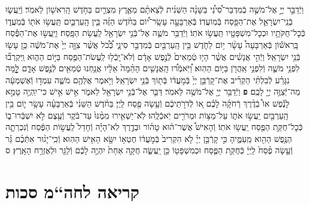 \documentclass[twoside, openany, parskip=half, 11pt]{book}
\begin{document}
\begin{footnotesize}
\begin{multicols}{2}
\\
\\
וַיְֿדַבֵּ֣ר יְיָ֣ אֶל־מֹשֶׁ֣ה בְֿמִדְבַּר־סִ֠ינַ֠י בַּשָּׁנָ֨ה הַשֵּׁנִ֜ית לְֿצֵאתָ֨ם מֵאֶ֧רֶץ מִצְרַ֛יִם בַּחֹ֥דֶשׁ הָֽרִאשׁ֖וֹן לֵאמֹֽר׃ וְֿיַֽעֲשׂ֧וּ בְֿנֵֽי־יִשְׂרָאֵ֛ל אֶת־הַפָּ֖סַח בְּֿמֽוֹעֲדֽוֹ׃ בְּֿאַרְבָּעָ֣ה עָשָֽׂר־י֠וֹם בַּחֹ֨דֶשׁ הַזֶּ֜ה בֵּ֧ין הָֽעַרְבַּ֛יִם תַּֽעֲשׂ֥וּ אֹת֖וֹ בְּֿמֹֽעֲד֑וֹ כְּֿכׇל־חֻקֹּתָ֥יו וּכְכׇל־מִשְׁפָּטָ֖יו תַּֽעֲשׂ֥וּ אֹתֽוֹ׃ וַיְֿדַבֵּ֥ר מֹשֶׁ֛ה אֶל־בְּֿנֵ֥י יִשְׂרָאֵ֖ל לַֽעֲשׂ֥ת הַפָּֽסַח׃ וַיַּֽעֲשׂ֣וּ אֶת־הַפֶּ֡סַח בָּֽרִאשׁ֡וֹן בְּֿאַרְבָּעָה֩ עָשָׂ֨ר י֥וֹם לַחֹ֛דֶשׁ בֵּ֥ין הָֽעַרְבַּ֖יִם בְּֿמִדְבַּ֣ר סִינָ֑י כְּֿ֠כֹ֠ל אֲשֶׁ֨ר צִוָּ֤ה יְיָ֙ אֶת־מֹשֶׁ֔ה כֵּ֥ן עָשׂ֖וּ בְּֿנֵ֥י יִשְׂרָאֵֽל׃
וַיְֿהִ֣י אֲנָשִׁ֗ים אֲשֶׁ֨ר הָי֤וּ טְֿמֵאִים֙ לְֿנֶ֣פֶשׁ אָדָ֔ם וְֿלֹא־יָֽכְֿל֥וּ לַֽעֲשֹׂת־הַפֶּ֖סַח בַּיּ֣וֹם הַה֑וּא וַֽיִּקְרְב֞וּ לִפְנֵ֥י מֹשֶׁ֛ה וְֿלִפְנֵ֥י אַֽהֲרֹ֖ן בַּיּ֥וֹם הַהֽוּא׃ וַ֠יֹּֽאמְֿר֠וּ הָֽאֲנָשִׁ֤ים הָהֵ֨מָּה֙ אֵלָ֔יו אֲנַ֥חְנוּ טְֿמֵאִ֖ים לְֿנֶ֣פֶשׁ אָדָ֑ם לׇׇׇָ֣מָּה נִגָּרַ֗ע לְֿבִלְתִּ֨י הַקְרִ֜יב אֶת־קָרְֿבַּ֤ן יְיָ֙ בְּֿמֹ֣עֲד֔וֹ בְּֿת֖וֹךְ בְּֿנֵ֥י יִשְׂרָאֵֽל׃ וַיֹּ֥אמֶר אֲלֵהֶ֖ם מֹשֶׁ֑ה עִמְד֣וּ וְֿאֶשְׁמְעָ֔ה מַה־יְּֿצַוֶּ֥ה יְיָ֖ לָכֶֽם׃ \textbf{פ}
וַיְֿדַבֵּ֥ר יְיָ֖ אֶל־מֹשֶׁ֥ה לֵּאמֹֽר׃ דַּבֵּ֛ר אֶל־בְּֿנֵ֥י יִשְׂרָאֵ֖ל לֵאמֹ֑ר אִ֣ישׁ אִ֣ישׁ כִּי־יִֽהְיֶ֥ה טָמֵ֣א לָנֶ֡פֶשׁ אוֹ֩ בְֿדֶ֨רֶךְ רְֿחֹקָ֜הֹ לָכֶ֗ם א֚וֹ לְֿדֹרֹ֣תֵיכֶ֔ם וְֿעָ֥שָׂה פֶ֖סַח לַֽיְיָ׃ בַּחֹ֨דֶשׁ הַשֵּׁנִ֜י בְּֿאַרְבָּעָ֨ה עָשָׂ֥ר י֛וֹם בֵּ֥ין הָֽעַרְבַּ֖יִם יַֽעֲשׂ֣וּ אֹת֑וֹ עַל־מַצּ֥וֹת וּמְרֹרִ֖ים יֹֽאכְֿלֻֽהוּ׃ לֹֽא־יַשְׁאִ֤ירוּ מִמֶּ֨נּוּ֙ עַד־בֹּ֔קֶר וְֿעֶ֖צֶם לֹ֣א יִשְׁבְּֿרוּ־ב֑וֹ כְּֿכׇל־חֻקַּ֥ת הַפֶּ֖סַח יַֽעֲשׂ֥וּ אֹתֽוֹ׃ וְֿהָאִישׁ֩ אֲשֶׁר־ה֨וּא טָה֜וֹר וּבְדֶ֣רֶךְ לֹֽא־הָיָ֗ה וְֿחָדַל֙ לַֽעֲשׂ֣וֹת הַפֶּ֔סַח וְֿנִכְרְתָ֛ה הַנֶּ֥פֶשׁ הַהִ֖וא מֵֽעַמֶּ֑יהָ כִּ֣י קָרְֿבַּ֣ן יְיָ֗ לֹ֤א הִקְרִיב֙ בְּֿמֹ֣עֲד֔וֹ חֶטְא֥וֹ יִשָּׂ֖א הָאִ֥ישׁ הַהֽוּא׃ וְֿכִֽי־יָג֨וּר אִתְּֿכֶ֜ם גֵּ֗ר וְֿעָ֤שָׂה פֶ֨סַח֙ לַֽיְיָ֔ כְּֿחֻקַּ֥ת הַפֶּ֛סַח וּכְמִשְׁפָּט֖וֹ כֵּ֣ן יַֽעֲשֶׂ֑ה חֻקָּ֤ה אַחַת֙ יִהְיֶ֣ה לָכֶ֔ם וְֿלַגֵּ֖ר וּלְאֶזְרַ֥ח הָאָֽרֶץ׃ ס

\end{multicols}

\clearpage

\section[חה“מ סכות]{קריאה לחה“מ סכות}


\end{footnotesize}
\end{document}
